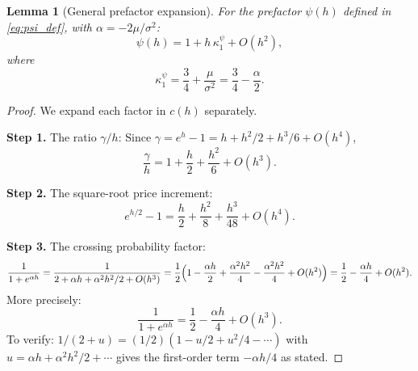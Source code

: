 \documentclass[11pt]{article}
\newtheorem{lemma}[theorem]{Lemma}
\theoremstyle{definition}
\theoremstyle{remark}
\begin{document}
\begin{lemma}[General prefactor expansion]\label{lem:prefactor_general}
For the prefactor $\psi(h)$ defined in \eqref{eq:psi_def}, with
$\alpha = -2\mu/\sigma^2$:
\begin{equation}\label{eq:psi_expand}
\psi(h) = 1 + h\,\kappa_1^{\psi} + O(h^2),
\end{equation}
where
\begin{equation}\label{eq:kappa1_psi}
\kappa_1^{\psi} = \frac{3}{4} + \frac{\mu}{\sigma^2}
= \frac{3}{4} - \frac{\alpha}{2}.
\end{equation}
\end{lemma}
\begin{proof}
We expand each factor in $c(h)$ separately.

\textbf{Step 1.} The ratio $\gamma/h$:
Since $\gamma = e^h - 1 = h + h^2/2 + h^3/6 + O(h^4)$,
\begin{equation}\label{eq:gamma_over_h}
\frac{\gamma}{h} = 1 + \frac{h}{2} + \frac{h^2}{6} + O(h^3).
\end{equation}

\textbf{Step 2.} The square-root price increment:
\begin{equation}\label{eq:sqrt_expand}
e^{h/2} - 1 = \frac{h}{2} + \frac{h^2}{8} + \frac{h^3}{48}
+ O(h^4).
\end{equation}

\textbf{Step 3.} The crossing probability factor:
\begin{equation}\label{eq:crossing_expand}
\frac{1}{1 + e^{\alpha h}}
= \frac{1}{2 + \alpha h + \alpha^2 h^2/2 + O(h^3)}
= \frac{1}{2}\Bigl(1 - \frac{\alpha h}{2}
+ \frac{\alpha^2 h^2}{4} - \frac{\alpha^2 h^2}{4} + O(h^2)\Bigr)
= \frac{1}{2} - \frac{\alpha h}{4} + O(h^2).
\end{equation}
More precisely:
\begin{equation}\label{eq:crossing_expand_v2}
\frac{1}{1 + e^{\alpha h}}
= \frac{1}{2} - \frac{\alpha h}{4}
+ O(h^3).
\end{equation}
To verify: $1/(2 + u) = (1/2)(1 - u/2 + u^2/4 - \cdots)$ with
$u = \alpha h + \alpha^2 h^2/2 + \cdots$ gives the first-order term
$-\alpha h/4$ as stated.


\end{proof}
\end{document}
